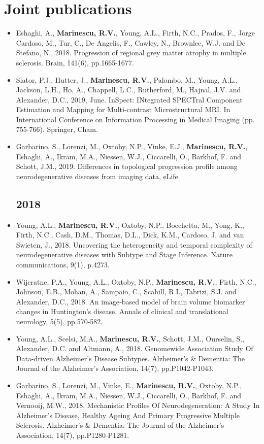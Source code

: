 \documentclass[a4paper,10pt]{article} %
\begin{document}
\section*{Joint publications}
\begin{itemize}
\subsection*{2019}
\item[\journal] Eshaghi, A., \textbf{Marinescu, R.V.}, Young, A.L., Firth, N.C., Prados, F., Jorge Cardoso, M., Tur, C., De Angelis, F., Cawley, N., Brownlee, W.J. and De Stefano, N., 2018. Progression of regional grey matter atrophy in multiple sclerosis. Brain, 141(6), pp.1665-1677.
\item[\poster] Slator, P.J., Hutter, J., \textbf{Marinescu, R.V.}, Palombo, M., Young, A.L., Jackson, L.H., Ho, A., Chappell, L.C., Rutherford, M., Hajnal, J.V. and Alexander, D.C., 2019, June. InSpect: INtegrated SPECTral Component Estimation and Mapping for Multi-contrast Microstructural MRI. In International Conference on Information Processing in Medical Imaging (pp. 755-766). Springer, Cham.
\item[\journal] Garbarino, S., Lorenzi, M., Oxtoby, N.P., Vinke, E.J., \textbf{Marinescu, R.V.}, Eshaghi, A., Ikram, M.A., Niessen, W.J., Ciccarelli, O., Barkhof, F. and Schott, J.M., 2019. Differences in topological progression profile among neurodegenerative diseases from imaging data, eLife
\subsection*{2018}
\item[\journal] Young, A.L., \textbf{Marinescu, R.V.}, Oxtoby, N.P., Bocchetta, M., Yong, K., Firth, N.C., Cash, D.M., Thomas, D.L., Dick, K.M., Cardoso, J. and van Swieten, J., 2018. Uncovering the heterogeneity and temporal complexity of neurodegenerative diseases with Subtype and Stage Inference. Nature communications, 9(1), p.4273.
\item[\journal] Wijeratne, P.A., Young, A.L., Oxtoby, N.P., \textbf{Marinescu, R.V.}, Firth, N.C., Johnson, E.B., Mohan, A., Sampaio, C., Scahill, R.I., Tabrizi, S.J. and Alexander, D.C., 2018. An image‐based model of brain volume biomarker changes in Huntington's disease. Annals of clinical and translational neurology, 5(5), pp.570-582.
\item[\poster] Young, A.L., Scelsi, M.A., \textbf{Marinescu, R.V.}, Schott, J.M., Ourselin, S., Alexander, D.C. and Altmann, A., 2018. Genomewide Association Study Of Data-driven Alzheimer's Disease Subtypes. Alzheimer's \& Dementia: The Journal of the Alzheimer's Association, 14(7), pp.P1042-P1043.
\item[\poster] Garbarino, S., Lorenzi, M., Vinke, E., \textbf{Marinescu, R.V.}, Oxtoby, N.P., Eshaghi, A., Ikram, M.A., Niessen, W.J., Ciccarelli, O., Barkhof, F. and Vernooij, M.W., 2018. Mechanistic Profiles Of Neurodegeneration: A Study In Alzheimer’s Disease, Healthy Ageing And Primary Progressive Multiple Sclerosis. Alzheimer's \& Dementia: The Journal of the Alzheimer's Association, 14(7), pp.P1280-P1281.


\end{itemize}
\end{document}
